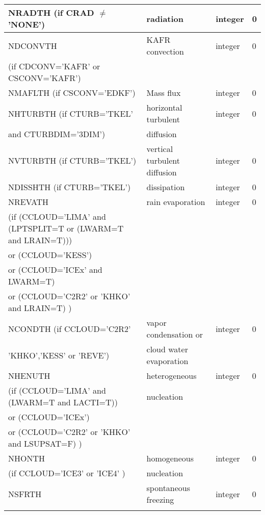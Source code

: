 \begin{longtable} {|p{}|p{}|>{\centering}p{}|p{}<{\centering}|}
NRADTH (if CRAD $\neq$ 'NONE')  & radiation           & integer  &  0 \index{NRADTH!\innam{NAM\_BU\_RTH}}\\\hline
NDCONVTH & KAFR convection          & integer  &  0 \index{NDCONVTH!\innam{NAM\_BU\_RTH}}\\ \nopagebreak
(if CDCONV='KAFR' or CSCONV='KAFR') &  &   &   \\\hline
NMAFLTH (if CSCONV='EDKF') & Mass flux & integer  &  0 \index{NMAFLTH!\innam{NAM\_BU\_RTH}} \\\hline
NHTURBTH (if CTURB='TKEL'& horizontal turbulent & integer  &  0 \index{NHTURBTH!\innam{NAM\_BU\_RTH}}\\ \nopagebreak
and CTURBDIM='3DIM') & diffusion&   &  \\\hline
NVTURBTH (if CTURB='TKEL') & vertical turbulent diffusion & integer  &  0 \index{NVTURBTH!\innam{NAM\_BU\_RTH}}\\\hline
NDISSHTH (if CTURB='TKEL') & dissipation         & integer  &  0 \index{NDISSHTH!\innam{NAM\_BU\_RTH}}\\\hline
NREVATH & rain evaporation    & integer  &  0 \index{NREVATH!\innam{NAM\_BU\_RTH}}\\ \nopagebreak
(if (CCLOUD='LIMA' and (LPTSPLIT=T or (LWARM=T and LRAIN=T))) & & & \\ \nopagebreak
 or (CCLOUD='KESS') & & & \\ \nopagebreak
 or (CCLOUD='ICEx' and LWARM=T) & & & \\ \nopagebreak
 or (CCLOUD='C2R2' or 'KHKO' and LRAIN=T) ) & & & \\ \hline
NCONDTH (if CCLOUD='C2R2'  & vapor condensation  or     & integer  &  0 \index{NCONDTH!\innam{NAM\_BU\_RTH}}\\ \nopagebreak
'KHKO','KESS' or 'REVE')& cloud water  evaporation  &          &    \\\hline
NHENUTH   & heterogeneous  & integer  &  0 \index{NHENUTH!\innam{NAM\_BU\_RTH}}\\ \nopagebreak
(if (CCLOUD='LIMA' and (LWARM=T and LACTI=T)) & nucleation & & \\ \nopagebreak
 or (CCLOUD='ICEx') & & & \\ \nopagebreak
 or (CCLOUD='C2R2' or 'KHKO' and LSUPSAT=F) ) & & & \\ \hline
NHONTH   & homogeneous  & integer  &  0 \index{NHONTH!\innam{NAM\_BU\_RTH}}\\ \nopagebreak
(if CCLOUD='ICE3' or 'ICE4' ) & nucleation&   &  \\\hline
NSFRTH   & spontaneous freezing& integer  &  0 \index{NSFRTH!\innam{NAM\_BU\_RTH}}\\ \nopagebreak

\end{longtable}
